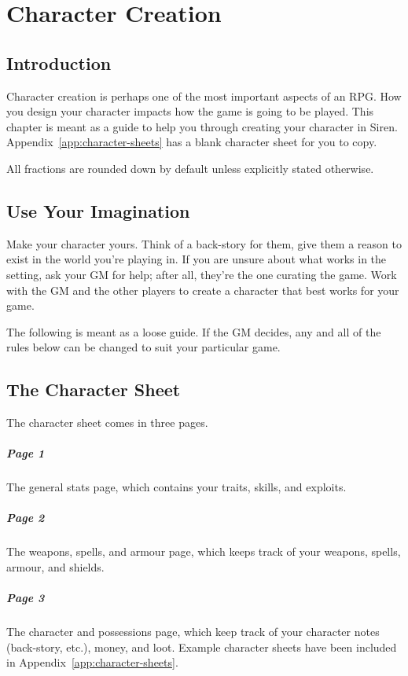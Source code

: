 \chapter{Character Creation}\label{chap:char-creat}
\section{Introduction}
Character creation is perhaps one of the most important aspects of an RPG.
How you design your character impacts how the game is going to be played.
This chapter is meant as a guide to help you through creating your character in Siren. 
Appendix~\ref{app:character-sheets} has a blank character sheet for you to copy.

\begin{note}
    All fractions are rounded down by default unless explicitly stated otherwise.
\end{note}

\section{Use Your Imagination}
Make your character yours.
Think of a back-story for them, give them a reason to exist in the world you're playing in.
If you are unsure about what works in the setting, ask your GM for help; after all, they're the one curating the game.
Work with the GM and the other players to create a character that best works for your game.

\begin{note} 
    The following is meant as a loose guide.
    If the GM decides, any and all of the rules below can be changed to suit your particular game.
\end{note}

\section{The Character Sheet}
The character sheet comes in three pages.
\paragraph{Page 1} The general stats page, which contains your traits, skills, and exploits.
\paragraph{Page 2} The weapons, spells, and armour page, which keeps track of your weapons, spells, armour, and shields.
\paragraph{Page 3} The character and possessions page, which keep track of your character notes (back-story, etc.), money, and loot.
Example character sheets have been included in Appendix~\ref{app:character-sheets}.


